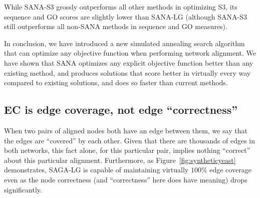 \documentclass{bioinfo}
\begin{document}

While SANA-S3 grossly outperforms all other methods in optimizing S3, its sequence and GO scores are slightly lower than SANA-LG (although SANA-S3 still outperforms all non-SANA methods in sequence and GO measures). %

In conclusion, we have introduced a new simulated annealing search algorithm that can optimize any objective function when performing network alignment.  We have shown that SANA optimizes any explicit objective function better than any existing method, and produces solutions that score better in virtually every way compared to existing solutions, and does so faster than current methods. %

\subsection{EC is edge coverage, not edge ``correctness''}

When two pairs of aligned nodes both have an edge between them, we say that the edges are ``covered'' by each other.  Given that there are thousands of edges in both networks, this fact alone, for this particular pair, implies nothing ``correct'' about this particular alignment.  Furthermore, as Figure~\ref{fig:syntheticyeast} demonstrates, SAGA-LG is capable of maintaining virtually $100\%$ edge coverage even as the node correctness (and ``correctness'' here does have meaning) drops significantly.
\end{document}
